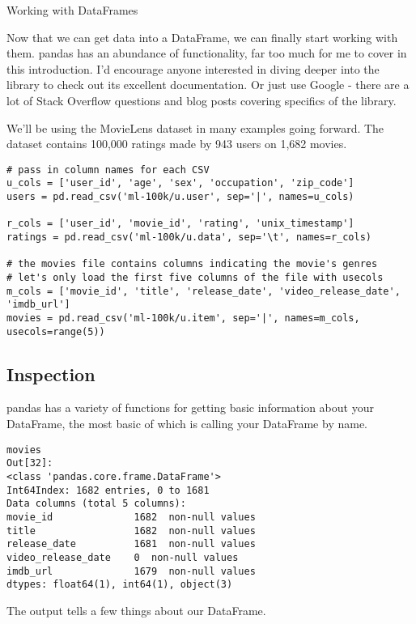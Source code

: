 \documentclass[]{article}
\title{}
\author{}
\begin{document}
Working with DataFrames

Now that we can get data into a DataFrame, we can finally start working with them. pandas has an abundance of functionality, far too much for me to cover in this introduction. I'd encourage anyone interested in diving deeper into the library to check out its excellent documentation. Or just use Google - there are a lot of Stack Overflow questions and blog posts covering specifics of the library.

We'll be using the MovieLens dataset in many examples going forward. The dataset contains 100,000 ratings made by 943 users on 1,682 movies.


\begin{verbatim}
# pass in column names for each CSV
u_cols = ['user_id', 'age', 'sex', 'occupation', 'zip_code']
users = pd.read_csv('ml-100k/u.user', sep='|', names=u_cols)

r_cols = ['user_id', 'movie_id', 'rating', 'unix_timestamp']
ratings = pd.read_csv('ml-100k/u.data', sep='\t', names=r_cols)

# the movies file contains columns indicating the movie's genres
# let's only load the first five columns of the file with usecols
m_cols = ['movie_id', 'title', 'release_date', 'video_release_date', 'imdb_url']
movies = pd.read_csv('ml-100k/u.item', sep='|', names=m_cols, usecols=range(5))
\end{verbatim}
\subsection{Inspection}

pandas has a variety of functions for getting basic information about your DataFrame, the most basic of which is calling your DataFrame by name.
\begin{verbatim}
movies
Out[32]:
<class 'pandas.core.frame.DataFrame'>
Int64Index: 1682 entries, 0 to 1681
Data columns (total 5 columns):
movie_id              1682  non-null values
title                 1682  non-null values
release_date          1681  non-null values
video_release_date    0  non-null values
imdb_url              1679  non-null values
dtypes: float64(1), int64(1), object(3)
\end{verbatim}
The output tells a few things about our DataFrame.
\end{document}
